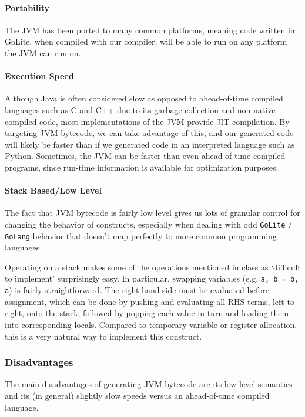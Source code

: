 \documentclass[11pt]{article}
\begin{document}
\paragraph{Portability}%
\label{sec:portability}
The JVM has been ported to many common platforms, meaning code written
in GoLite, when compiled with our compiler, will be able to run on any
platform the JVM can run on.
\paragraph{Execution Speed}%
\label{sec:execs}
Although Java is often considered slow as opposed to ahead-of-time
compiled languages such as C and C++ due to its garbage collection and
non-native compiled code, most implementations of the JVM provide JIT
compilation.  By targeting JVM bytecode, we can take advantage of
this, and our generated code will likely be faster than if we
generated code in an interpreted language such as Python. Sometimes,
the JVM can be faster than even ahead-of-time compiled programs, since
run-time information is available for optimization purposes.
\paragraph{Stack Based/Low Level}%
\label{sec:stack}
The fact that JVM bytecode is fairly low level gives us lots of
granular control for changing the behavior of constructs, especially
when dealing with odd \texttt{GoLite} / \texttt{GoLang} behavior that
doesn't map perfectly to more common programming languages.

Operating on a stack makes some of the operations mentioned in class
as `difficult to implement' surprisingly easy. In particular, swapping
variables (e.g. \texttt{a, b = b, a}) is fairly straightforward. The
right-hand side must be evaluated before assignment, which can be done
by pushing and evaluating all RHS terms, left to right, onto the
stack; followed by popping each value in turn and loading them into
corresponding locals. Compared to temporary variable or register
allocation, this is a very natural way to implement this construct.

\subsubsection{Disadvantages}
The main disadvantages of generating JVM bytecode are its low-level
semantics and its (in general) slightly slow speeds versus an
ahead-of-time compiled language.
\end{document}
